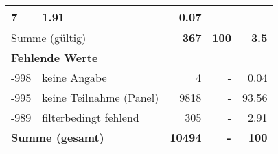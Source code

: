 \begin{longtable}{lXrrr}
       \num{7} &
       \num[round-mode=places,round-precision=2]{1.91} &
         \num[round-mode=places,round-precision=2]{0.07} \\
     \midrule
     \multicolumn{2}{l}{Summe (gültig)} &
       \textbf{\num{367}} &
     \textbf{\num{100}} &
       \textbf{\num[round-mode=places,round-precision=2]{3.5}} \\
     \multicolumn{5}{l}{\textbf{Fehlende Werte}}\\
       -998 &
       keine Angabe &
         \num{4} &
        - &
         \num[round-mode=places,round-precision=2]{0.04} \\
       -995 &
       keine Teilnahme (Panel) &
         \num{9818} &
        - &
         \num[round-mode=places,round-precision=2]{93.56} \\
       -989 &
       filterbedingt fehlend &
         \num{305} &
        - &
         \num[round-mode=places,round-precision=2]{2.91} \\
     \midrule
     \multicolumn{2}{l}{\textbf{Summe (gesamt)}} &
          \textbf{\num{10494}} &
        \textbf{-} &
        \textbf{\num{100}} \\
     \bottomrule
     \end{longtable}
     

